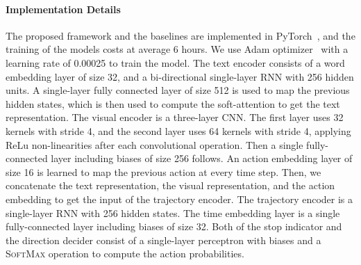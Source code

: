 \documentclass[11pt,a4paper]{article}
\begin{document}
\paragraph{Implementation Details} The proposed framework and the baselines are implemented in PyTorch~\cite{paszke2019pytorch}, and the training of the models costs at average 6 hours. We use Adam optimizer~\cite{kingma2014adam} with a learning rate of 0.00025 to train the model. The text encoder consists of a word embedding layer of size 32, and a bi-directional single-layer RNN with 256 hidden units. A single-layer fully connected layer of size 512 is used to map the previous hidden states, which is then used to compute the soft-attention to get the text representation. The visual encoder is a three-layer CNN. The first layer uses 32  kernels with stride 4, and the second layer uses 64  kernels with stride 4, applying ReLu non-linearities after each convolutional operation. Then a single fully-connected layer including biases of size 256 follows. An action embedding layer of size 16 is learned to map the previous action at every time step. Then, we concatenate the text representation, the visual representation, and the action embedding to get the input of the trajectory encoder. The trajectory encoder is a single-layer RNN with 256 hidden states. The time embedding layer is a single fully-connected layer including biases of size 32. Both of the stop indicator and the direction decider consist of a single-layer perceptron with biases and a \textsc{SoftMax} operation to compute the action probabilities.

\begin{table}[t]
\small
  \centering
  \setlength{\tabcolsep}{3pt}
  \caption{Experimental results of the baseline models with and without \textsc{L2Stop} module on the development set.}
  \label{table_}
\end{table}
\end{document}
